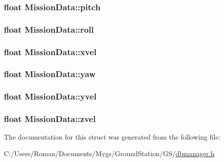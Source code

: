 \subsubsection[{pitch}]{\setlength{\rightskip}{0pt plus 5cm}float Mission\+Data\+::pitch}\label{struct_mission_data_a43974cedf16a4aa6645145224a4c3e77}
\hypertarget{struct_mission_data_a9fca0a04ef126efa755e91c2a96a536e}{}
\subsubsection[{roll}]{\setlength{\rightskip}{0pt plus 5cm}float Mission\+Data\+::roll}\label{struct_mission_data_a9fca0a04ef126efa755e91c2a96a536e}
\hypertarget{struct_mission_data_a6a86665d3ace692fec591d90ef69d7b3}{}
\subsubsection[{xvel}]{\setlength{\rightskip}{0pt plus 5cm}float Mission\+Data\+::xvel}\label{struct_mission_data_a6a86665d3ace692fec591d90ef69d7b3}
\hypertarget{struct_mission_data_a186d118b99361b39a581ae01cf20e2c3}{}
\subsubsection[{yaw}]{\setlength{\rightskip}{0pt plus 5cm}float Mission\+Data\+::yaw}\label{struct_mission_data_a186d118b99361b39a581ae01cf20e2c3}
\hypertarget{struct_mission_data_a0551fec33eeabd071cebf089603ed122}{}
\subsubsection[{yvel}]{\setlength{\rightskip}{0pt plus 5cm}float Mission\+Data\+::yvel}\label{struct_mission_data_a0551fec33eeabd071cebf089603ed122}
\hypertarget{struct_mission_data_abe305df8910d25abeb1638dd6693081b}{}
\subsubsection[{zvel}]{\setlength{\rightskip}{0pt plus 5cm}float Mission\+Data\+::zvel}\label{struct_mission_data_abe305df8910d25abeb1638dd6693081b}


The documentation for this struct was generated from the following file\+:\begin{DoxyCompactItemize}
\item 
C\+:/\+Users/\+Roman/\+Documents/\+Mygs/\+Ground\+Station/\+G\+S/\hyperlink{dbmanager_8h}{dbmanager.\+h}\end{DoxyCompactItemize}

